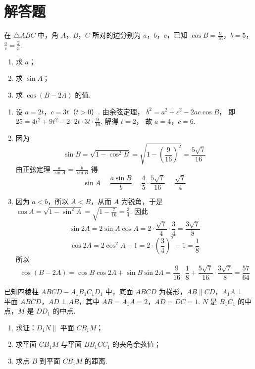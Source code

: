 \section{解答题}

\begin{problem}
在 \(\triangle ABC\) 中，角 \(A\)，\(B\)，\(C\) 所对的边分别为 \(a\)，\(b\)，\(c\)，已知 \(\cos B=\frac{9}{16}\)，\(b=5\)，\(\frac{a}{c}=\frac23\).
\begin{enumerate}
    \item 求 \(a\)；
    \item 求 \(\sin A\)；
    \item 求 \(\cos(B-2A)\) 的值.
\end{enumerate}
\end{problem}

\begin{solution}
\begin{enumerate}
    \item 设
\(a=2t\)，\(c=3t\)（\(t>0\)）.
由余弦定理，
\(b^2=a^2+c^2-2ac\cos B\)，
即
\(25=4t^2+9t^2-2\cdot 2t\cdot 3t\cdot \frac{9}{16}\).
解得
\(t=2\)，
故
\(a=4\)，\(c=6\).

    \item 因为
\[
\sin B=\sqrt{1-\cos^2 B} =\sqrt{1-\left(\frac{9}{16}\right)^2} =\frac{5\sqrt7}{16}
\]
由正弦定理
\(\frac{a}{\sin A}=\frac{b}{\sin B}\)
得
\[
\sin A=\frac{a\sin B}{b} =\frac{4}{5}\cdot \frac{5\sqrt7}{16} =\frac{\sqrt7}{4}
\]

    \item 因为 \(a<b\)，所以 \(A<B\)，从而 \(A\) 为锐角，于是
\(\cos A=\sqrt{1-\sin^2 A} =\sqrt{1-\frac{7}{16}} =\frac34\).
因此
\[
\sin 2A=2\sin A\cos A =2\cdot \frac{\sqrt7}{4}\cdot \frac34 =\frac{3\sqrt7}{8}
\]
\[
\cos 2A=2\cos^2 A-1 =2\cdot \left(\frac34\right)^2-1 =\frac18
\]
所以
\[
\cos(B-2A)=\cos B\cos 2A+\sin B\sin 2A =\frac{9}{16}\cdot \frac18+\frac{5\sqrt7}{16}\cdot \frac{3\sqrt7}{8} =\frac{57}{64}
\]
\end{enumerate}
\end{solution}

\begin{problem}
已知四棱柱 \(ABCD-A_1B_1C_1D_1\) 中，底面 \(ABCD\) 为梯形，\(AB\parallel CD\)，\(A_1A\perp\) 平面 \(ABCD\)，\(AD\perp AB\)，其中 \(AB=A_1A=2\)，\(AD=DC=1\).
\(N\) 是 \(B_1C_1\) 的中点，\(M\) 是 \(DD_1\) 的中点.
\begin{enumerate}
    \item 求证：\(D_1N\parallel\) 平面 \(CB_1M\)；
    \item 求平面 \(CB_1M\) 与平面 \(BB_1CC_1\) 的夹角余弦值；
    \item 求点 \(B\) 到平面 \(CB_1M\) 的距离.
\end{enumerate}

\end{problem}

